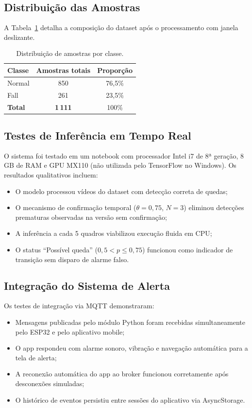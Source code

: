 \documentclass[12pt,a4paper]{article}
\begin{document}
\subsection{Distribuição das Amostras}

A Tabela~\ref{tab:amostras} detalha a composição do dataset após o processamento com janela deslizante.

\begin{table}[H]
\centering
\caption{Distribuição de amostras por classe.}
\label{tab:amostras}
\begin{tabular}{lcc}
\toprule
\textbf{Classe} & \textbf{Amostras totais} & \textbf{Proporção} \\
\midrule
Normal & 850 & 76,5\% \\
Fall   & 261 & 23,5\% \\
\midrule
\textbf{Total} & \textbf{1\,111} & 100\% \\
\bottomrule
\end{tabular}
\end{table}

\subsection{Testes de Inferência em Tempo Real}

O sistema foi testado em um notebook com processador Intel i7 de 8ª geração, 8\,GB de RAM e GPU MX110 (não utilizada pelo TensorFlow no Windows). Os resultados qualitativos incluem:

\begin{itemize}[nosep]
  \item O modelo processou vídeos do dataset com detecção correta de quedas;
  \item O mecanismo de confirmação temporal ($\theta = 0{,}75$, $N = 3$) eliminou detecções prematuras observadas na versão sem confirmação;
  \item A inferência a cada 5 quadros viabilizou execução fluida em CPU;
  \item O status ``Possível queda'' ($0{,}5 < p \leq 0{,}75$) funcionou como indicador de transição sem disparo de alarme falso.
\end{itemize}

\subsection{Integração do Sistema de Alerta}

Os testes de integração via MQTT demonstraram:
\begin{itemize}[nosep]
  \item Mensagens publicadas pelo módulo Python foram recebidas simultaneamente pelo ESP32 e pelo aplicativo mobile;
  \item O app respondeu com alarme sonoro, vibração e navegação automática para a tela de alerta;
  \item A reconexão automática do app ao broker funcionou corretamente após desconexões simuladas;
  \item O histórico de eventos persistiu entre sessões do aplicativo via AsyncStorage.
\end{itemize}
\end{document}
